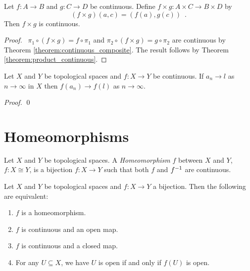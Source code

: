 \begin{proposition}
    Let $f : A \rightarrow B$ and $g : C \rightarrow D$ be continuous. Define $f \times g : A \times C \rightarrow B \times D$ by
    \[ (f \times g)(a,c) = (f(a), g(c)) \enspace . \]
    Then $f \times g$ is continuous.
\end{proposition}

\begin{proof}
    \pf\ $\pi_1 \circ (f \times g) = f \circ \pi_1$ and $\pi_2 \circ (f \times g) = g \circ \pi_2$ are continuous
    by Theorem \ref{theorem:continuous_composite}. The result follows by Theorem \ref{theorem:product_continuous}.
\end{proof}

\begin{proposition}
    \label{proposition:converge_continuous}
    Let $X$ and $Y$ be topological spaces and $f : X \rightarrow Y$ be continuous. If $a_n \rightarrow l$ as $n \rightarrow \infty$ in $X$ then
    $f(a_n) \rightarrow f(l)$ as $n \rightarrow \infty$.
\end{proposition}

\begin{proof}
    \pf
    \qed
\end{proof}

\section{Homeomorphisms}

\begin{definition}[Homeomorphism]
    Let $X$ and $Y$ be topological spaces. A \emph{Homeomorphism} $f$ between $X$ and $Y$, $f : X \cong Y$,
    is a bijection $f : X \rightarrow Y$ such that both $f$ and ${f}^{-1}$ are continuous.
\end{definition}

\begin{lemma}
    \label{lemma:homeomorphism}
    Let $X$ and $Y$ be topological spaces and $f : X \rightarrow Y$ a bijection. Then the following are
    equivalent:
    \begin{enumerate}
        \item $f$ is a homeomorphism.
        \item $f$ is continuous and an open map.
        \item $f$ is continuous and a closed map.
        \item For any $U \subseteq X$, we have $U$ is open if and only if $f(U)$ is open.
    \end{enumerate}
\end{lemma}

